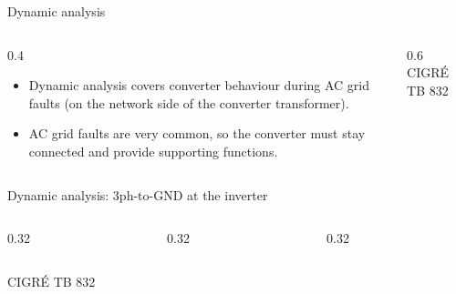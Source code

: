 \begin{frame}{Dynamic analysis}
  \begin{columns}[c,onlytextwidth]
    \begin{column}{0.4\textwidth}
      \begin{itemize}
        \setlength{\itemsep}{0.4em}
        \item Dynamic analysis covers converter behaviour during AC grid
              faults (on the network side of the converter transformer).
        \item AC grid faults are very common, so the converter must stay
              connected and provide supporting functions.
      \end{itemize}
      \vspace{0.3em}
    \end{column}
    \begin{column}{0.6\textwidth}
      \centering
      {\color{atGray}\footnotesize CIGR\'E TB 832}
    \end{column}
  \end{columns}
\end{frame}

\begin{frame}{Dynamic analysis: 3ph-to-GND at the inverter}
  \centering
  \begin{columns}[c,onlytextwidth]
    \begin{column}{0.32\textwidth}\centering
      \end{column}
    \begin{column}{0.32\textwidth}\centering
      \end{column}
    \begin{column}{0.32\textwidth}\centering
      \end{column}
  \end{columns}
  \vspace{0.3em}
  {\color{atGray}\footnotesize CIGR\'E TB 832}
\end{frame}

